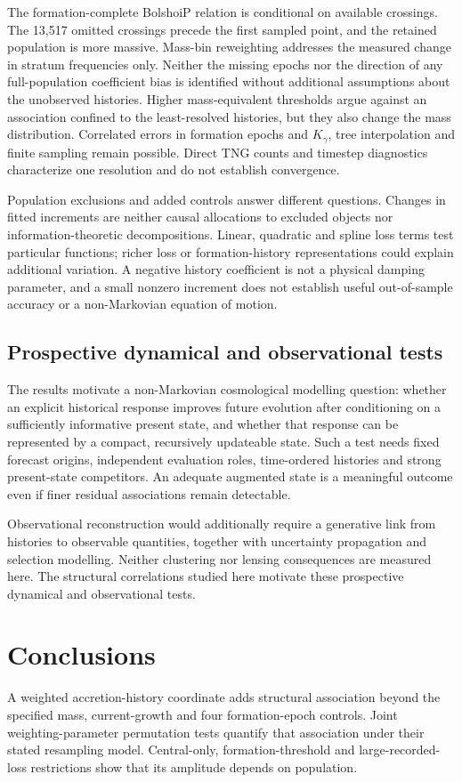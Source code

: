 \documentclass[11pt,a4paper]{article}
\begin{document}
The formation-complete BolshoiP relation is conditional on available crossings. The 13,517 omitted crossings precede the first sampled point, and the retained population is more massive. Mass-bin reweighting addresses the measured change in stratum frequencies only. Neither the missing epochs nor the direction of any full-population coefficient bias is identified without additional assumptions about the unobserved histories. Higher mass-equivalent thresholds argue against an association confined to the least-resolved histories, but they also change the mass distribution. Correlated errors in formation epochs and $K_\gamma$, tree interpolation and finite sampling remain possible. Direct TNG counts and timestep diagnostics characterize one resolution and do not establish convergence.

Population exclusions and added controls answer different questions. Changes in fitted increments are neither causal allocations to excluded objects nor information-theoretic decompositions. Linear, quadratic and spline loss terms test particular functions; richer loss or formation-history representations could explain additional variation. A negative history coefficient is not a physical damping parameter, and a small nonzero increment does not establish useful out-of-sample accuracy or a non-Markovian equation of motion.

\subsection{Prospective dynamical and observational tests}
The results motivate a non-Markovian cosmological modelling question: whether an explicit historical response improves future evolution after conditioning on a sufficiently informative present state, and whether that response can be represented by a compact, recursively updateable state. Such a test needs fixed forecast origins, independent evaluation roles, time-ordered histories and strong present-state competitors. An adequate augmented state is a meaningful outcome even if finer residual associations remain detectable.

Observational reconstruction would additionally require a generative link from histories to observable quantities, together with uncertainty propagation and selection modelling. Neither clustering nor lensing consequences are measured here. The structural correlations studied here motivate these prospective dynamical and observational tests.

\section{Conclusions}
A weighted accretion-history coordinate adds structural association beyond the specified mass, current-growth and four formation-epoch controls. Joint weighting-parameter permutation tests quantify that association under their stated resampling model. Central-only, formation-threshold and large-recorded-loss restrictions show that its amplitude depends on population.
\end{document}
